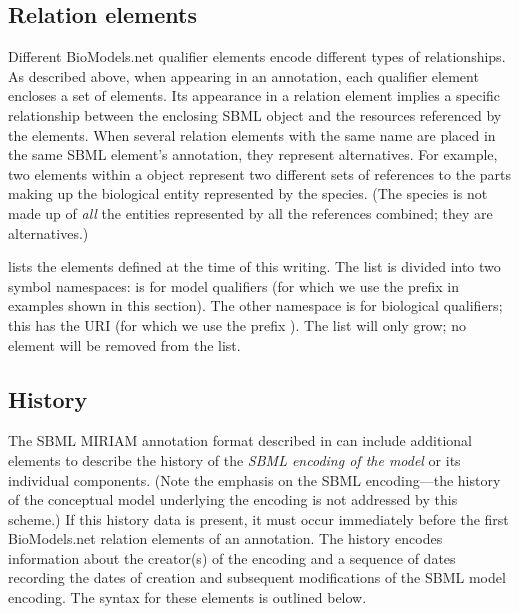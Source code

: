 \subsection{Relation elements}
\label{sec:qualified-dc-annotation}

Different BioModels.net qualifier elements encode different types
of relationships.  As described above, when appearing in an
annotation, each qualifier element encloses a set of
 elements.  Its appearance in a relation element
implies a specific relationship between the enclosing SBML object
and the resources referenced by the  elements.
When several relation elements with the same name are placed in
the same SBML element's annotation, they represent alternatives.
For example, two  elements within a \Species
object represent two different sets of references to the parts
making up the biological entity represented by the species.  (The
species is not made up of \emph{all} the entities represented by
all the references combined; they are alternatives.)

 lists the elements defined at
the time of this writing.  The list is divided into two symbol
namespaces:  is for model qualifiers
(for which we use the
prefix  in examples shown in this section).  The
other namespace is for biological qualifiers; this has the URI
 (for which we use
the prefix ).  The list will only grow; \ie no
element will be removed from the list.

\clearpage

\subsection{History}
\label{sec:model-history-annotation}

The SBML MIRIAM annotation format described in
 can include additional elements
to describe the history of the \emph{SBML encoding of the model}
or its individual components.  (Note the emphasis on the SBML
encoding---the history of the conceptual model underlying the
encoding is not addressed by this scheme.)  If this history data
is present, it must occur immediately before the first
BioModels.net relation elements of an annotation.  The history
encodes information about the creator(s) of the encoding and a
sequence of dates recording the dates of creation and subsequent
modifications of the SBML model encoding.  The syntax for these
elements is outlined below.

